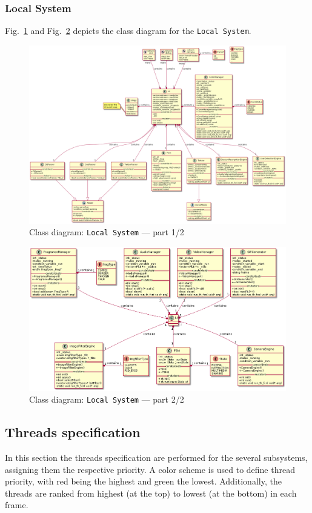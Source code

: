 \subsubsection{Local System}
\label{sec:local-system-class}
%
Fig.~\ref{fig:class-diag-local-1} and Fig.~\ref{fig:class-diag-local-2} depicts the class diagram for the
\texttt{Local System}.
%
\begin{figure}[htb!]
\centering
    \includegraphics[width=1.0\columnwidth]{./img/class-diag-local-1.png}
  \caption{Class diagram: \texttt{Local System} --- part 1/2}%
\label{fig:class-diag-local-1}
\end{figure}
%
\begin{figure}[htb!]
\centering
    \includegraphics[width=1.0\columnwidth]{./img/class-diag-local-2.png}
  \caption{Class diagram: \texttt{Local System} --- part 2/2}%
\label{fig:class-diag-local-2}
\end{figure}

\subsection{Threads specification}
\label{sec:thre-spec}
In this section the threads specification are performed for the several
subsystems, assigning them the respective priority. A color scheme is used to
define thread priority, with red being the highest and green the
lowest. Additionally, the threads are ranked from highest (at the top) to lowest
(at the bottom) in each frame.

